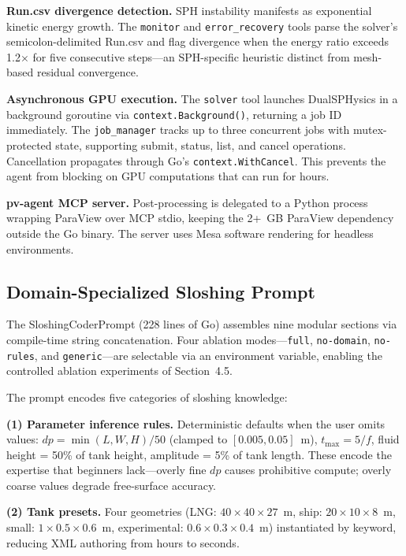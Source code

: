 \documentclass[11pt]{article}
\begin{document}
\textbf{Run.csv divergence detection.} SPH instability manifests as exponential kinetic energy growth. The \texttt{monitor} and \texttt{error\_recovery} tools parse the solver's semicolon-delimited Run.csv and flag divergence when the energy ratio exceeds 1.2$\times$ for five consecutive steps---an SPH-specific heuristic distinct from mesh-based residual convergence.

\textbf{Asynchronous GPU execution.} The \texttt{solver} tool launches DualSPHysics in a background goroutine via \texttt{context.Background()}, returning a job ID immediately. The \texttt{job\_manager} tracks up to three concurrent jobs with mutex-protected state, supporting submit, status, list, and cancel operations. Cancellation propagates through Go's \texttt{context.WithCancel}. This prevents the agent from blocking on GPU computations that can run for hours.

\textbf{pv-agent MCP server.} Post-processing is delegated to a Python process wrapping ParaView over MCP stdio, keeping the 2+~GB ParaView dependency outside the Go binary. The server uses Mesa software rendering for headless environments.

\subsection{Domain-Specialized Sloshing Prompt}

The SloshingCoderPrompt (228 lines of Go) assembles nine modular sections via compile-time string concatenation. Four ablation modes---\texttt{full}, \texttt{no-domain}, \texttt{no-rules}, and \texttt{generic}---are selectable via an environment variable, enabling the controlled ablation experiments of Section~4.5.

The prompt encodes five categories of sloshing knowledge:

\textbf{(1) Parameter inference rules.} Deterministic defaults when the user omits values: $\mathit{dp} = \min(L,W,H)/50$ (clamped to $[0.005, 0.05]$~m), $t_{\max} = 5/f$, fluid height = 50\% of tank height, amplitude = 5\% of tank length. These encode the expertise that beginners lack---overly fine $\mathit{dp}$ causes prohibitive compute; overly coarse values degrade free-surface accuracy.

\textbf{(2) Tank presets.} Four geometries (LNG: $40{\times}40{\times}27$~m, ship: $20{\times}10{\times}8$~m, small: $1{\times}0.5{\times}0.6$~m, experimental: $0.6{\times}0.3{\times}0.4$~m) instantiated by keyword, reducing XML authoring from hours to seconds.
\end{document}
